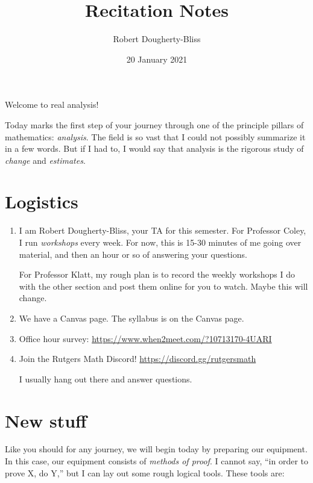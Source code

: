\documentclass[12pt]{article}
\title{Recitation Notes}
\author{Robert Dougherty-Bliss}
\date{20 January 2021}
\theoremstyle{definition}
\begin{document}
\maketitle

Welcome to real analysis!

Today marks the first step of your journey through one of the principle pillars
of mathematics: \emph{analysis}. The field is so vast that I could not possibly
summarize it in a few words. But if I had to, I would say that analysis is the
rigorous study of \emph{change} and \emph{estimates}.

\section*{Logistics}%
\label{sec:logistics}

\begin{enumerate}
    \item I am Robert Dougherty-Bliss, your TA for this semester. For Professor
        Coley, I run \emph{workshops} every week. For now, this is 15-30
        minutes of me going over material, and then an hour or so of answering
        your questions.

        For Professor Klatt, my rough plan is to record the weekly workshops I
        do with the other section and post them online for you to watch. Maybe
        this will change.

    \item We have a Canvas page. The syllabus is on the Canvas page.

    \item Office hour survey: \url{https://www.when2meet.com/?10713170-4UARI}

    \item Join the Rutgers Math Discord! \url{https://discord.gg/rutgersmath}

        I usually hang out there and answer questions.
\end{enumerate}

\section*{New stuff}%
\label{sec:new_stuff}

Like you should for any journey, we will begin today by preparing our
equipment. In this case, our equipment consists of \emph{methods of proof}. I
cannot say, ``in order to prove X, do Y,'' but I can lay out some rough logical
tools. These tools are:
\end{document}
